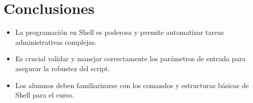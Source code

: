 \documentclass{article}
\begin{document}
\section{Conclusiones}
\begin{itemize}
    \item La programación en Shell es poderosa y permite automatizar tareas administrativas complejas.
    \item Es crucial validar y manejar correctamente los parámetros de entrada para asegurar la robustez del script.
    \item Los alumnos deben familiarizarse con los comandos y estructuras básicas de Shell para el curso.
\end{itemize}
\end{document}
